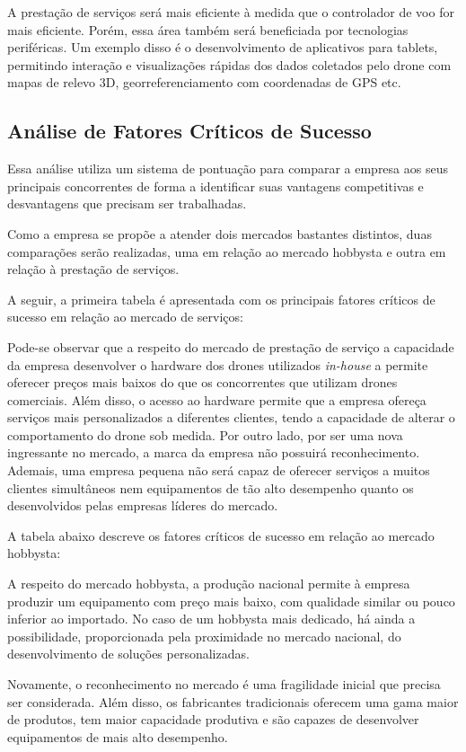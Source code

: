 A prestação de serviços será mais eficiente à medida que o controlador de voo for mais eficiente. Porém, 
essa área também será beneficiada por tecnologias periféricas. Um exemplo disso é o desenvolvimento de 
aplicativos para tablets, permitindo interação e visualizações rápidas dos dados coletados pelo drone com 
mapas de relevo 3D, georreferenciamento com coordenadas de GPS etc.

\subsection{Análise de Fatores Críticos de Sucesso}

Essa análise utiliza um sistema de pontuação para comparar a empresa aos seus principais concorrentes de 
forma a identificar suas vantagens competitivas e desvantagens que precisam ser trabalhadas.

Como a empresa se propõe a atender dois mercados bastantes distintos, duas comparações serão realizadas, 
uma em relação ao mercado hobbysta e outra em relação à prestação de serviços.

A seguir, a primeira tabela é apresentada com os principais fatores críticos de sucesso em relação ao 
mercado de serviços:


Pode-se observar que a respeito do mercado de prestação de serviço a capacidade da empresa desenvolver 
o hardware dos drones utilizados \emph{in-house} a permite oferecer preços mais baixos do que os concorrentes 
que utilizam drones comerciais. Além disso, o acesso ao hardware permite que a empresa ofereça serviços mais 
personalizados a diferentes clientes, tendo a capacidade de alterar o comportamento do drone sob medida. 
Por outro lado, por ser uma nova ingressante no mercado, a marca da empresa não possuirá reconhecimento. 
Ademais, uma empresa pequena não será capaz de oferecer serviços a muitos clientes simultâneos nem equipamentos 
de tão alto desempenho quanto os desenvolvidos pelas empresas líderes do mercado.

A tabela abaixo descreve os fatores críticos de sucesso em relação ao mercado hobbysta:


A respeito do mercado hobbysta, a produção nacional permite à empresa produzir um equipamento com preço 
mais baixo, com qualidade similar ou pouco inferior ao importado. No caso de um hobbysta mais dedicado, 
há ainda a possibilidade, proporcionada pela proximidade no mercado nacional, do desenvolvimento de soluções 
personalizadas.

Novamente, o reconhecimento no mercado é uma fragilidade inicial que precisa ser considerada. Além disso, 
os fabricantes tradicionais oferecem uma gama maior de produtos, tem maior capacidade produtiva e são 
capazes de desenvolver equipamentos de mais alto desempenho.